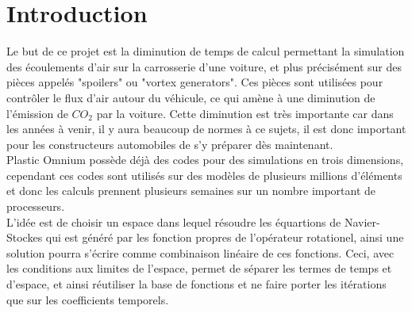 \chapter{Introduction}

Le but de ce projet est la diminution de temps de calcul permettant la simulation des \'ecoulements d'air sur la carrosserie d'une voiture, et plus pr\'ecis\'ement sur des pi\`eces appel\'es "spoilers" ou "vortex generators". Ces pi\`eces sont utilis\'ees pour contr\^oler le flux d'air autour du v\'ehicule, ce qui am\`ene \`a une diminution de l'\'emission de $CO_2$ par la voiture. Cette diminution est tr\`es importante car dans les ann\'ees \`a venir, il y aura beaucoup de normes \`a ce sujets, il est donc important pour les constructeurs automobiles de s'y pr\'eparer d\`es maintenant.\\
Plastic Omnium poss\`ede d\'ej\`a des codes pour des simulations en trois dimensions, cependant ces codes sont utilis\'es sur des mod\`eles de plusieurs millions d'\'el\'ements et donc les calculs prennent plusieurs semaines sur un nombre important de processeurs.\\
L'id\'ee est de choisir un espace dans lequel résoudre les \'equartions de Navier-Stockes qui est g\'en\'er\'e par  les fonction propres de l'op\'erateur rotationel, ainsi une solution pourra s'\'ecrire comme combinaison lin\'eaire de ces fonctions. Ceci, avec les conditions aux limites de l'espace, permet de séparer les termes de temps et d'espace, et ainsi  réutiliser la base de fonctions et ne faire porter les itérations que sur les coefficients temporels.

